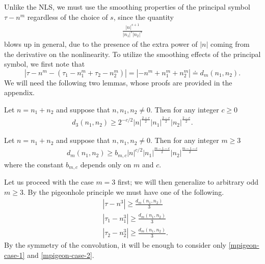 %
%
Unlike the NLS, we must use the smoothing properties of the
principal symbol $\tau - n^m$ regardless of the choice of $s$, since the quantity
%
%
\begin{equation}
	\label{mconvo-multiplier}
	\begin{split}
		\frac{|n|^{s+1}}{|n_1|^s |n_2|^s }
	\end{split}
\end{equation}
%
%
blows up in general, due to the presence of the extra power of $|n|$ coming from the derivative on
the nonlinearity. To utilize the smoothing effects of the principal symbol, we
first note that 
$$| \tau - n^m - \left( \tau_1 - n_1^m 
+ \tau_2 - n_2^m  \right ) | = | - n^m + n_1^m +
n_2^m| \doteq d_m(n_1, n_2).$$ We will need the following two lemmas, whose
proofs are provided in the appendix.
%
%
%
\begin{lemma}
	\label{mlem:number-theory1}
	Let $n=n_1 + n_2$ and suppose that $n, n_1, n_2\neq
	0$. Then for any integer $c \ge 0$
%
%
\begin{equation}
	\begin{split}
		\label{mnumber-theory1}
		d_3(n_1,n_2) \ge 2^{-c/2} | n |^{\frac{2+c}{2}} | n_{1}
		|^{\frac{2-c}{2}}| n_2 |^{\frac{2-c}{2}}.
	\end{split}
\end{equation}
%
%
\end{lemma}
%
%
%
%
%
%
\begin{lemma}
	\label{mlem:number-theory}
	Let $n=n_1 + n_2$ and suppose that $n, n_1, n_2\neq
	0$. Then for any integer  $m \ge 3$
%
%
\begin{equation}
	\begin{split}
		\label{mnumber-theory}
		d_m(n_1,n_2) \ge b_{m, c } 
		|n|^{c/2} |n_1|^{\frac{m-1-c}{2}} | n_2 |^{\frac{m-1-c}{2}}
		\end{split}
\end{equation}
%
%
where the constant $b_{m,c}$ depends only on $m$ and $c$. 
\end{lemma}
%
%
%
%
Let us proceed with the case $m=3$ first; we will then generalize to arbitrary
odd $m \ge 3$. By the pigeonhole principle we must have one of the 
following.
%
%
\begin{align}
	\label{mpigeon-case-1}
	& |\tau - n^3| \ge \frac{d_m(n_1, n_2)}{3} 
		 \\
		\label{mpigeon-case-2}
		& | \tau_1 - n_1^3 | \ge \frac{d_m(n_1, n_2)}{3} 
		 \\
		\label{mpigeon-case-3}
		& | \tau_2 - n_2^3 | \ge \frac{d_m(n_1, n_2)}{3}.
		\end{align}
%
%
By the symmetry of the convolution, it will be enough to consider only
\eqref{mpigeon-case-1} and \eqref{mpigeon-case-2}.
%
%
%
